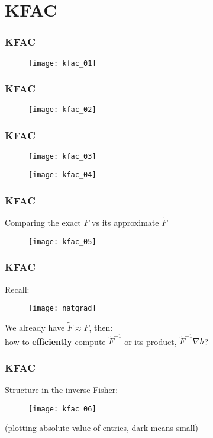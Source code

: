 \section{KFAC}

\begin{frame}
\frametitle{KFAC}

\begin{figure}
    \centering
    \texttt{[image: kfac\_01]}
\end{figure}

\end{frame}

\begin{frame}
\frametitle{KFAC}

\begin{figure}
    \centering
    \texttt{[image: kfac\_02]}
\end{figure}

\end{frame}

\begin{frame}
\frametitle{KFAC}

\begin{figure}
    \centering
    \texttt{[image: kfac\_03]}
\end{figure}

\begin{figure}
    \centering
    \texttt{[image: kfac\_04]}
\end{figure}

\end{frame}

\begin{frame}
\frametitle{KFAC}
Comparing the exact $F$ vs its approximate $\tilde{F}$
\begin{figure}
    \centering
    \texttt{[image: kfac\_05]}
\end{figure}

\end{frame}

\begin{frame}
\frametitle{KFAC}
Recall:
\begin{figure}
    \centering
    \texttt{[image: natgrad]}
\end{figure}

We already have $\tilde{F} \approx F$, then: \\
how to \textbf{efficiently} compute $\tilde{F}^{-1}$ or its product, $\tilde{F}^{-1}\nabla h$?
\end{frame}

\begin{frame}
\frametitle{KFAC}
Structure in the inverse Fisher:
\begin{figure}
    \centering
    \texttt{[image: kfac\_06]}
\end{figure}
(plotting absolute value of entries, dark means small)

\end{frame}
